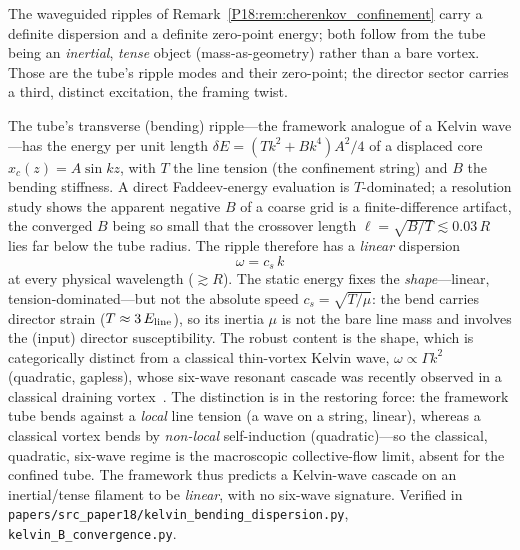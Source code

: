 The waveguided ripples of Remark~\ref{P18:rem:cherenkov_confinement} carry a
definite dispersion and a definite zero-point energy; both follow from the tube
being an \emph{inertial}, \emph{tense} object (mass-as-geometry) rather than a
bare vortex. Those are the tube's ripple modes and their zero-point; the director
sector carries a third, distinct excitation, the framing twist.

\begin{proposition}
\label{P18:prop:linear_kelvin}
The tube's transverse (bending) ripple---the framework analogue of a Kelvin
wave---has the energy per unit length $\delta E=(T k^2+B k^4)A^2/4$ of a
displaced core $x_c(z)=A\sin kz$, with $T$ the line tension (the confinement
string) and $B$ the bending stiffness. A direct Faddeev-energy evaluation is
$T$-dominated; a resolution study shows the apparent negative $B$ of a coarse
grid is a finite-difference artifact, the converged $B$ being so small that the
crossover length $\ell=\sqrt{B/T}\lesssim0.03\,R$ lies far below the tube
radius. The ripple therefore has a \emph{linear} dispersion
\begin{equation}
  \omega = c_s\,k
  \label{P18:eq:linear_kelvin}
\end{equation}
at every physical wavelength ($\gtrsim R$). The static energy fixes the
\emph{shape}---linear, tension-dominated---but not the absolute speed
$c_s=\sqrt{T/\mu}$: the bend carries director strain ($T\approx3\,E_{\rm line}$),
so its inertia $\mu$ is not the bare line mass and involves the (input) director
susceptibility. The robust content is the shape, which is categorically distinct
from a classical thin-vortex Kelvin wave, $\omega\propto\Gamma k^2$ (quadratic,
gapless), whose six-wave resonant cascade was recently observed in a classical
draining vortex~\cite{Barckicke2026}. The distinction is in the restoring force:
the framework tube bends against a \emph{local} line tension (a wave on a string,
linear), whereas a classical vortex bends by \emph{non-local} self-induction
(quadratic)---so the classical, quadratic, six-wave regime is the macroscopic
collective-flow limit, absent for the confined tube. The
framework thus predicts a Kelvin-wave cascade on an inertial/tense filament to
be \emph{linear}, with no six-wave signature. Verified in
\texttt{papers/src\_paper18/kelvin\_bending\_dispersion.py},
\texttt{kelvin\_B\_convergence.py}.
\end{proposition}

